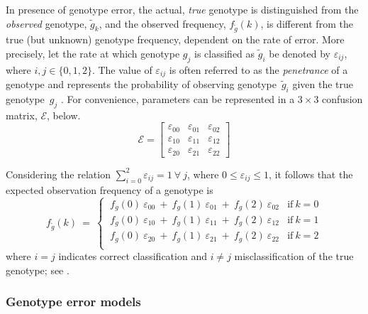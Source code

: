 In presence of genotype error, the actual, \emph{true} genotype is distinguished from the \emph{observed} genotype, $\tilde{g}_k$, and the observed frequency, ${f_{\tilde{g}}(k)}$, is different from the true (but unknown) genotype frequency, dependent on the rate of error.
More precisely, let the rate at which genotype $g_j$ is classified as $\tilde{g}_i$ be denoted by $\varepsilon_{ij}$, where ${i,j \in \lbrace 0, 1, 2 \rbrace}$.
The value of $\varepsilon_{ij}$ is often referred to as the \emph{penetrance} of a genotype and represents the probability of observing genotype~$\tilde{g}_i$ given the true genotype~$g_j$ \citep{ott1999analysis,Gordon:2002cz}.
For convenience,  parameters can be represented in a ${3 \times 3}$ confusion matrix, $\mathcal{E}$, below.
\begin{equation}\label{eq:errormatrix}%
\mathcal{E} =
\begin{bmatrix}
	\varepsilon_{00}  &  \varepsilon_{01}  &  \varepsilon_{02}  \\
	\varepsilon_{10}  &  \varepsilon_{11}  &  \varepsilon_{12}  \\
	\varepsilon_{20}  &  \varepsilon_{21}  &  \varepsilon_{22}
\end{bmatrix}
\end{equation}

Considering the relation ${\sum_{i=0}^{2} \varepsilon_{ij} = 1 ~ \forall ~ j}$, where ${0 \leq \varepsilon_{ij} \leq 1}$, it follows that the expected observation frequency of a genotype is
\begin{equation}\label{eq:errfrqprob}%
f_{\tilde{g}}(k) ~=~
\begin{cases}
~	f_g(0)~\varepsilon_{00} ~+~
	f_g(1)~\varepsilon_{01} ~+~
	f_g(2)~\varepsilon_{02}  &  \text{if} ~ k = 0 \\
~	f_g(0)~\varepsilon_{10} ~+~
	f_g(1)~\varepsilon_{11} ~+~
	f_g(2)~\varepsilon_{12}  &  \text{if} ~ k = 1 \\
~	f_g(0)~\varepsilon_{20} ~+~
	f_g(1)~\varepsilon_{21} ~+~
	f_g(2)~\varepsilon_{22}  &  \text{if} ~ k = 2 \\
\end{cases}
\end{equation}
where $i=j$ indicates correct classification and $i \neq j$ misclassification of the true genotype; see \citet{Moskvina:2006fz}.


%
\subsubsection{Genotype error models}
%


